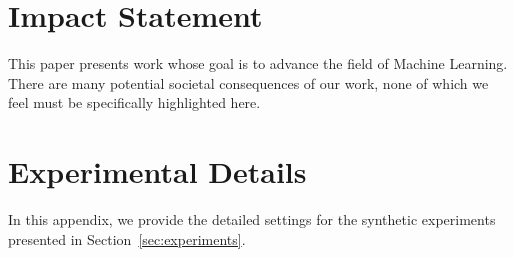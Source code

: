 \documentclass{article}
\theoremstyle{plain}
\theoremstyle{definition}
\theoremstyle{remark}
\begin{document}



\section*{Impact Statement}

This paper presents work whose goal is to advance the field of Machine
Learning. There are many potential societal consequences of our work, none of which we feel must be specifically highlighted here.





\newpage
\appendix
\onecolumn
\appendix
\onecolumn

\section{Experimental Details}
\label{app:exp_details}

In this appendix, we provide the detailed settings for the synthetic experiments presented in Section~\ref{sec:experiments}.
\end{document}
